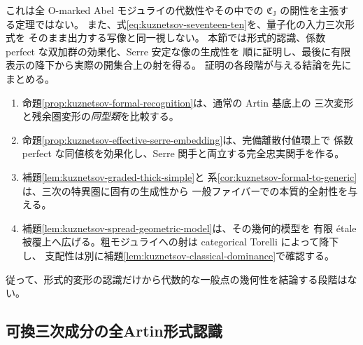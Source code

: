 これは全 O-marked Abel モジュライの代数性やその中での
$\mathfrak C_{\mathrm J}$ の開性を主張する定理ではない。
また、式\eqref{eq:kuznetsov-seventeen-ten}を、量子化の入力三次形式を
そのまま出力する写像と同一視しない。
本節では形式的認識、係数 perfect な双加群の効果化、Serre 安定な像の生成性を
順に証明し、最後に有限表示の降下から実際の開集合上の射を得る。
証明の各段階が与える結論を先にまとめる。
\begin{enumerate}[label=\textup{(\roman*)}]
\item 命題\ref{prop:kuznetsov-formal-recognition}は、通常の Artin 基底上の
三次変形と残余圏変形の\emph{同型類}を比較する。
\item 命題\ref{prop:kuznetsov-effective-serre-embedding}は、完備離散付値環上で
係数 perfect な同値核を効果化し、Serre 関手と両立する完全忠実関手を作る。
\item 補題\ref{lem:kuznetsov-graded-thick-simple}と
系\ref{cor:kuznetsov-formal-to-generic}は、三次の特異圏に固有の生成性から
一般ファイバーでの本質的全射性を与える。
\item 補題\ref{lem:kuznetsov-spread-geometric-model}は、その幾何的模型を
有限 étale 被覆上へ広げる。粗モジュライへの射は categorical Torelli によって降下し、
支配性は別に補題\ref{lem:kuznetsov-classical-dominance}で確認する。
\end{enumerate}
従って、形式的変形の認識だけから代数的な一般点の幾何性を結論する段階はない。

\subsection{可換三次成分の全Artin形式認識}

